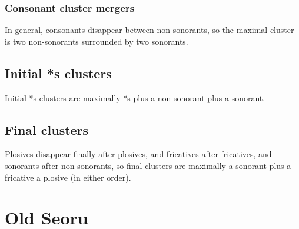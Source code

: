 \documentclass[12pt]{article}
\begin{document}
\subsubsection{Consonant cluster mergers}
In general, consonants disappear between non sonorants, so the maximal cluster
is two non-sonorants surrounded by two sonorants.

\subsection{Initial *s clusters}
Initial *s clusters are maximally *s plus a non sonorant plus a sonorant.

\subsection{Final clusters}
Plosives disappear finally after plosives, and fricatives after fricatives, and
sonorants after non-sonorants, so final clusters are maximally a sonorant plus
a fricative a plosive (in either order).

\section{Old Seoru}
\end{document}
